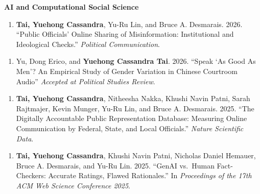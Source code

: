 \documentclass[10.5pt,]{article}
\providecommand{\tightlist}{%
	\setlength{\itemsep}{0pt}\setlength{\parskip}{0pt}}
\renewenvironment{itemize}{
	\begin{list}{}{
			\setlength{\leftmargin}{1.5em}
		}
	}{
	\end{list}
}
\begin{document}
\begin{itemize}
\tightlist
\item
  \textbf{AI and Computational Social Science}

  \begin{itemize}
  \tightlist
  \item
    \begin{enumerate}
    \def\labelenumi{\arabic{enumi}.}
    \setcounter{enumi}{17}
    \tightlist
    \item
      \textbf{Tai, Yuehong Cassandra}, Yu-Ru Lin, and Bruce A.
      Desmarais. 2026. ``Public Oﬀicials' Online Sharing of
      Misinformation: Institutional and Ideological Checks.''
      \emph{Political Communication}.
    \end{enumerate}
  \item
    \begin{enumerate}
    \def\labelenumi{\arabic{enumi}.}
    \setcounter{enumi}{16}
    \tightlist
    \item
      Yu, Dong Erico, and \textbf{Yuehong Cassandra Tai}. 2026. ``Speak
      `As Good As Men'? An Empirical Study of Gender Variation in
      Chinese Courtroom Audio'' \emph{Accepted at Political Studies
      Review}.
    \end{enumerate}
  \item
    \begin{enumerate}
    \def\labelenumi{\arabic{enumi}.}
    \setcounter{enumi}{15}
    \tightlist
    \item
      \textbf{Tai, Yuehong Cassandra}, Nitheesha Nakka, Khushi Navin
      Patni, Sarah Rajtmajer, Kevin Munger, Yu-Ru Lin, and Bruce A.
      Desmarais. 2025. ``The Digitally Accountable Public Representation
      Database: Measuring Online Communication by Federal, State, and
      Local Oﬀicials.'' \emph{Nature Scientific Data}.
    \end{enumerate}
  \item
    \begin{enumerate}
    \def\labelenumi{\arabic{enumi}.}
    \setcounter{enumi}{14}
    \tightlist
    \item
      \textbf{Tai, Yuehong Cassandra}, Khushi Navin Patni, Nicholas
      Daniel Hemauer, Bruce A. Desmarais, and Yu-Ru Lin. 2025. ``GenAI
      vs.~Human Fact-Checkers: Accurate Ratings, Flawed Rationales.'' In
      \emph{Proceedings of the 17th ACM Web Science Conference 2025}.
    \end{enumerate}
  \item
    \begin{enumerate}

\end{enumerate}
\end{itemize}
\end{itemize}
\end{document}
